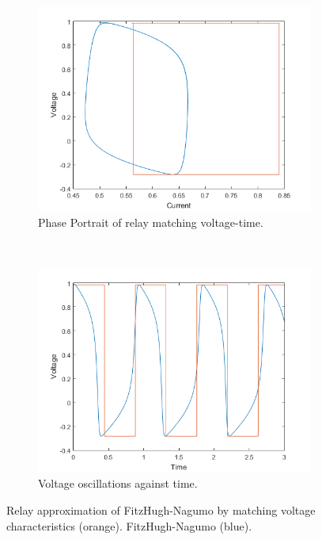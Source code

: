 \documentclass[a4paper]{article}
\begin{document}
\begin{figure}[h!]
    \centering
    \begin{subfigure}[t]{0.49\textwidth}
        \includegraphics[width=\textwidth]{fitz_relay_match_time_period_phase_potrait}
        \caption{Phase Portrait of relay matching voltage-time.}
        \label{fn_match_voltage_time_pp}
    \end{subfigure}
    ~ %
    \begin{subfigure}[t]{0.49\textwidth}
        \includegraphics[width=\textwidth]{fitz_relay_match_time_period_voltage_time}
        \caption{Voltage oscillations against time.}
        \label{fn_match_voltage_time_vt}
    \end{subfigure}
\caption{Relay approximation of FitzHugh-Nagumo by matching voltage characteristics (orange). FitzHugh-Nagumo (blue).}
\label{fn_match_voltage_time}
\end{figure}
\end{document}
